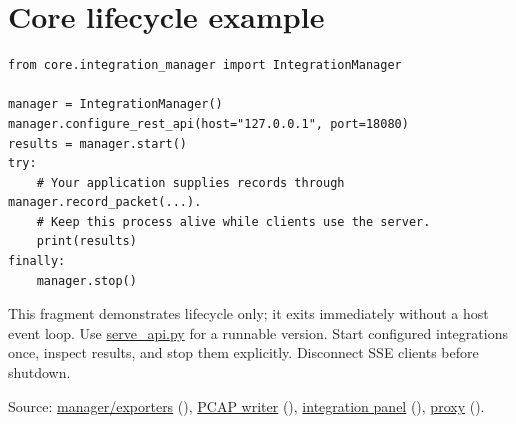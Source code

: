 \section*{Core lifecycle example}
\par\noindent\begin{minipage}{\linewidth}
\begin{lstlisting}[title={PYTHON}]
from core.integration_manager import IntegrationManager

manager = IntegrationManager()
manager.configure_rest_api(host="127.0.0.1", port=18080)
results = manager.start()
try:
    # Your application supplies records through manager.record_packet(...).
    # Keep this process alive while clients use the server.
    print(results)
finally:
    manager.stop()
\end{lstlisting}
\end{minipage}\par
\par\noindent\begin{minipage}{\linewidth}\setlength{\parskip}{5pt}
This fragment demonstrates lifecycle only; it exits immediately without a host event loop. Use \hyperref[reference-files]{serve\_api.py} for a runnable version. Start configured integrations once, inspect results, and stop them explicitly. Disconnect SSE clients before shutdown.
{\footnotesize\color{muted}\raggedright Source: \href{https://github.com/neerajjayesh/GridSec-project/blob/main/core/integration_manager.py}{manager/exporters} (), \href{https://github.com/neerajjayesh/GridSec-project/blob/main/core/pcap_writer.py}{PCAP writer} (), \href{https://github.com/neerajjayesh/GridSec-project/blob/main/gui/integration_panel.py}{integration panel} (), \href{https://github.com/neerajjayesh/GridSec-project/blob/main/core/pdc_proxy.py}{proxy} ().\par}
\end{minipage}\par

